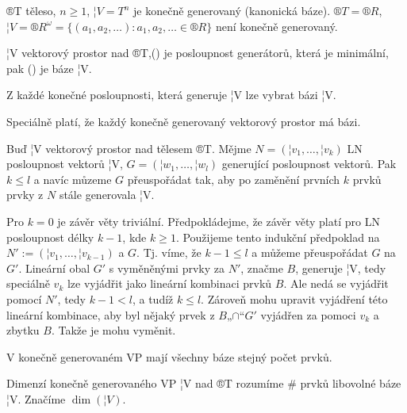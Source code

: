 \documentclass[12pt]{article}					%
\begin{document}
        \begin{priklady}
            ®T těleso, $n≥1$, $¦V = T^n$ je konečně generovaný (kanonická báze). $®T = ®R$, $¦V = ®R^\omega = \{(a_1, a_2, …): a_1, a_2, … \in ®R\}$ není konečně generovaný.
        \end{priklady}

        \begin{tvrzeni}
            ¦V vektorový prostor nad ®T,() je posloupnost generátorů, která je minimální, pak () je báze ¦V.
        \end{tvrzeni}

        \begin{dusledek}
            Z každé konečné posloupnosti, která generuje ¦V lze vybrat bázi ¦V.

            Speciálně platí, že každý konečně generovaný vektorový prostor má bázi.
        \end{dusledek}

        \begin{veta}
            Buď ¦V vektorový prostor nad tělesem ®T. Mějme $N = (¦v_1, …, ¦v_k)$ LN posloupnost vektorů ¦V, $G = (¦w_1, …, ¦w_l)$ generující posloupnost vektorů. Pak $k≤l$ a navíc můzeme $G$ přeuspořádat tak, aby po zaměnění prvních $k$ prvků prvky z $N$ stále generovala ¦V.
            \begin{dukazin}
                    Pro $k=0$ je závěr věty triviální. Předpokládejme, že závěr věty platí pro LN posloupnost délky $k-1$, kde $k ≥ 1$. Použijeme tento indukční předpoklad na $N':=(¦v_1, …, ¦v_{k-1})$ a $G$. Tj. víme, že $k-1 ≤ l$ a můžeme přeuspořádat $G$ na $G'$. Lineární obal $G'$ s vyměněnými prvky za $N'$, značme $B$, generuje ¦V, tedy speciálně $v_k$ lze vyjádřit jako lineární kombinaci prvků $B$. Ale nedá se vyjádřit pomocí $N'$, tedy $k-1 < l$, a tudíž $k ≤ l$. Zároveň mohu upravit vyjádření této lineární kombinace, aby byl nějaký prvek z $B „\cap“ G'$ vyjádřen za pomoci $v_k$ a zbytku $B$. Takže je mohu vyměnit.
            \end{dukazin}
        \end{veta}

        \begin{dusledek}
            V konečně generovaném VP mají všechny báze stejný počet prvků.
        \end{dusledek}

        \begin{definice}
            Dimenzí konečně generovaného VP ¦V nad ®T rozumíme \#{} prvků libovolné báze ¦V. Značíme $\dim(¦V)$.
        \end{definice}
\end{document}
